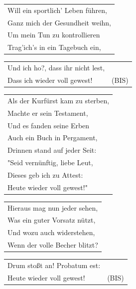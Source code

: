 \documentclass[a4paper, 14pt]{extarticle}
\begin{document}
\begin{flushleft}
\begin{tabularx}{\textwidth} {
    >{\raggedright\arraybackslash}X}
Will ein sportlich’ Leben führen,\\
Ganz mich der Gesundheit weihn,\\
Um mein Tun zu kontrollieren\\
Trag’ich’s in ein Tagebuch ein,\\
\end{tabularx}
\begin{tabularx}{\textwidth} {
    >{\raggedright\arraybackslash}X |c}
Und ich ho?, dass ihr nicht lest, &\\
Dass ich wieder voll gewest! & (BIS)\\
\end{tabularx}
\end{flushleft}
\begin{flushleft}
\begin{tabularx}{\textwidth} {
    >{\raggedright\arraybackslash}X}
Als der Kurfürst kam zu sterben,\\
Machte er sein Testament,\\
Und es fanden seine Erben\\
Auch ein Buch in Pergament,\\
Drinnen stand auf jeder Seit:\\
"Seid vernünftig, liebe Leut,\\
Dieses geb ich zu Attest:\\
Heute wieder voll gewest!"\\
\end{tabularx}
\end{flushleft}
\begin{flushleft}
\begin{tabularx}{\textwidth} {
    >{\raggedright\arraybackslash}X}
Hieraus mag nun jeder sehen,\\
Was ein guter Vorsatz nützt,\\
Und wozu auch widerstehen,\\
Wenn der volle Becher blitzt?\\
\end{tabularx}
\begin{tabularx}{\textwidth} {
    >{\raggedright\arraybackslash}X |c}
Drum stoßt an! Probatum est: & \\
Heute wieder voll gewest! & (BIS) \\
\end{tabularx}
\end{flushleft}
\newpage
\end{document}
